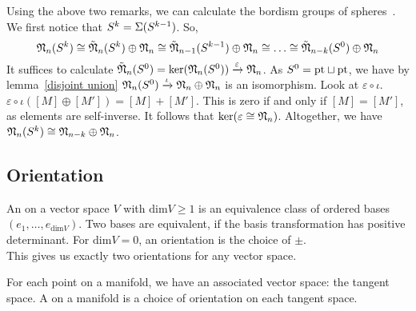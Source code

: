 \documentclass[a4paper,11pt]{article}
\begin{document}
Using the above two remarks, we can calculate the bordism groups of spheres\ \cite[Proposition 6.1]{zhang}. We first notice that \(S^k=\Sigma(S^{k-1})\). So,
\[\mathfrak{N}_n(S^k)\cong\tilde{\mathfrak{N}}_n(S^k)\oplus\mathfrak{N}_n\cong\tilde{\mathfrak{N}}_{n-1}(S^{k-1})\oplus\mathfrak{N}_n\cong\dots\cong\tilde{\mathfrak{N}}_{n-k}(S^0)\oplus\mathfrak{N}_n\]
It suffices to calculate \(\tilde{\mathfrak{N}}_n(S^0)=\ker(\mathfrak{N}_n(S^0))\xrightarrow{\varepsilon}\mathfrak{N}_n\). As \(S^0=\mathrm{pt}\sqcup\mathrm{pt}\), we have by lemma\ \ref{disjoint union} \(\mathfrak{N}_n(S^0)\xrightarrow{\iota}\mathfrak{N}_n\oplus\mathfrak{N}_n\) is an isomorphism. 
Look at \(\varepsilon\circ\iota\). \(\varepsilon\circ\iota([M]\oplus[M'])=[M]+[M']\). This is zero if and only if \([M]=[M']\), as elements are self-inverse. It follows that \(\ker(\varepsilon\cong\mathfrak{N}_n)\). 
Altogether, we have \(\mathfrak{N}_n(S^k)\cong\mathfrak{N}_{n-k}\oplus\mathfrak{N}_n\).

\subsection{Orientation}


\begin{definition}
    An  on a vector space \(V\) with \(\mathrm{dim} V\geq 1\) is an equivalence class of ordered bases \((e_1,\dots,e_{\mathrm{dim}V})\). Two bases are equivalent, if the basis transformation has positive determinant. For \(\mathrm{dim}V=0\), an orientation is the choice of \(\pm\).\\
    This gives us exactly two orientations for any vector space.
\end{definition}

\begin{definition}
    For each point on a manifold, we have an associated vector space: the tangent space. A  on a manifold is a choice of orientation on each tangent space.
\end{definition}

\end{document}
